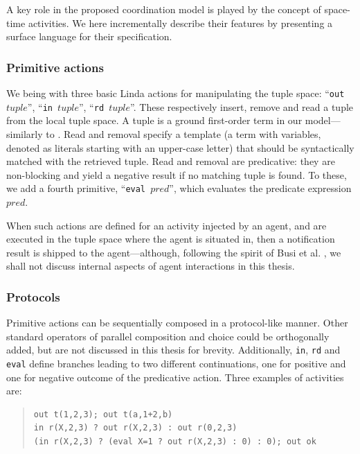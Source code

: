 \documentclass[12pt,a4paper,twoside,openright]{book}
\begin{document}
A key role in the proposed coordination model is played by the concept of space-time activities.
%
We here incrementally describe their features by presenting a surface language for their specification.

\subsubsection*{Primitive actions}

We being with three basic Linda actions for manipulating the tuple space: ``\texttt{out $tuple$}'', ``\texttt{in $tuple$}'', ``\texttt{rd $tuple$}''. 
%
These respectively insert, remove and read a tuple from the local tuple space.
%
A tuple is a ground first-order term in our model---similarly to \cite{tucson-aamas99}.
%
Read and removal specify a template (a term with variables, denoted as literals starting with an upper-case letter) that should be syntactically matched with the retrieved tuple. 
%
Read and removal are predicative: they are non-blocking and yield a negative result if no matching tuple is found. 
%
To these, we add a fourth primitive, ``\texttt{eval $pred$}'', which evaluates the predicate expression $pred$.

When such actions are defined for an activity injected by an agent, and are executed in the tuple space where the agent is situated in, then a notification result is shipped to the agent---although, following the spirit of Busi et al. \cite{zavattaro}, we shall not discuss internal aspects of agent interactions in this thesis.

\subsubsection*{Protocols}

Primitive actions can be sequentially composed in a protocol-like manner.
%
Other standard operators of parallel composition and choice could be orthogonally added, but are not discussed in this thesis for brevity.
%
Additionally, \texttt{in}, \texttt{rd} and \texttt{eval} define branches leading to two different continuations, one for positive and one for negative outcome of the predicative action.
%
Three examples of activities are:

{\codefont\begin{quote} 
\begin{verbatim}
out t(1,2,3); out t(a,1+2,b)
in r(X,2,3) ? out r(X,2,3) : out r(0,2,3)
(in r(X,2,3) ? (eval X=1 ? out r(X,2,3) : 0) : 0); out ok
\end{verbatim}\end{quote}
}
\end{document}
